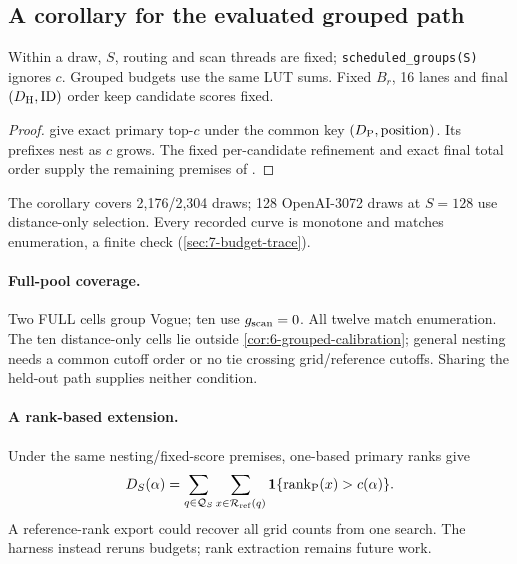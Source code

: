 \subsection{A corollary for the evaluated grouped path}

Within a draw, $S$, routing and scan threads are fixed; \texttt{scheduled\_groups(S)} ignores $c$. Grouped budgets use the same LUT sums. Fixed $B_r$, 16 lanes and final $(D_{\mathrm{H}},\mathrm{ID})$ order keep candidate scores fixed.

\par\noindent\begin{minipage}{\linewidth}
\begin{proof}
 give exact
primary top-$c$ under the common key $(D_{\mathrm{P}},\mathrm{position})$.
Its prefixes nest as $c$ grows. The fixed per-candidate refinement and
exact final total order supply the remaining premises of
.
\end{proof}
\end{minipage}\par\medskip

The corollary covers 2,176/2,304 draws; 128 OpenAI-3072 draws at $S=128$ use distance-only selection. Every recorded curve is monotone and matches enumeration, a finite check (\cref{sec:7-budget-trace}).

\paragraph{Full-pool coverage.}
Two FULL cells group Vogue; ten use $g_{\mathrm{scan}}=0$. All twelve match enumeration. The ten distance-only cells lie outside \cref{cor:6-grouped-calibration}; general nesting needs a common cutoff order or no tie crossing grid/reference cutoffs. Sharing the held-out path supplies neither condition.

\paragraph{A rank-based extension.}
Under the same nesting/fixed-score premises, one-based primary ranks give
\begin{equation}
 D_S(\alpha)=\sum_{q\in\mathcal Q_S}\sum_{x\in\mathcal R_{\rm ref}(q)}
 \mathbf1\{\operatorname{rank}_{\rm P}(x)>c(\alpha)\}.
 \label{eq:6-rank-curve}
\end{equation}
A reference-rank export could recover all grid counts from one search. The harness instead reruns budgets; rank extraction remains future work.